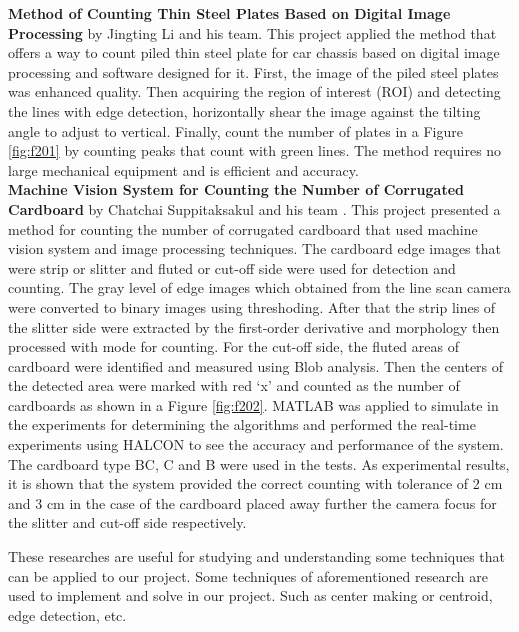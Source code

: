 \textbf{Method of Counting Thin Steel Plates Based on Digital Image Processing}
by Jingting Li and his team.\cite{Method} This project applied the method that offers a way to count piled thin steel plate for car chassis based on digital image processing and software designed for it. First, the image of the piled steel plates was enhanced quality. Then acquiring the region of interest (ROI) and detecting the lines with edge detection, horizontally shear the image against the tilting angle to adjust to vertical. Finally, count the number of plates in a Figure \ref{fig:f201} by counting peaks that count with green lines. The method requires no large mechanical equipment and is efficient and accuracy.\\

\textbf{Machine Vision System for Counting the Number of Corrugated Cardboard}
by Chatchai Suppitaksakul and his team \cite{Machine}. This project presented a method for counting the number of corrugated cardboard that used machine vision system and image processing techniques. The cardboard edge images that were strip or slitter and fluted or cut-off side were used for detection and counting. The gray level of edge images which obtained from the line scan camera were converted to binary images using threshoding. After that the strip lines of the slitter side were extracted by the first-order derivative and morphology then processed with mode for counting. For the cut-off side, the fluted areas of cardboard were identified and measured using Blob analysis. Then the centers of the detected area were marked with red ‘x’ and counted as the number of cardboards as shown in a Figure \ref{fig:f202}. MATLAB was applied to simulate in the experiments for determining the algorithms and performed the real-time experiments using HALCON to see the accuracy and performance of the system. The cardboard type BC, C and B were used in the tests. As experimental results, it is shown that the system provided the correct counting with tolerance of 2 cm and 3 cm in the case of the cardboard placed away further the camera focus for the slitter and cut-off side respectively.


These researches are useful for studying and understanding some techniques that can be applied to our project. Some techniques of aforementioned research are used to implement and solve in our project. Such as center making or centroid, edge detection, etc. 
